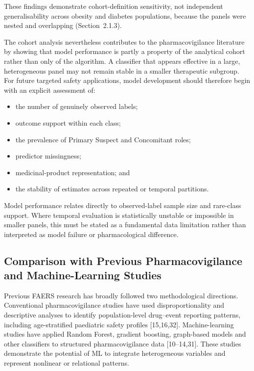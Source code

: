 \documentclass[10pt]{article}
\begin{document}
These findings demonstrate cohort-definition sensitivity, not independent generalisability across obesity and diabetes populations, because the panels were nested and overlapping (Section~2.1.3).

The cohort analysis nevertheless contributes to the pharmacovigilance literature by showing that model performance is partly a property of the analytical cohort rather than only of the algorithm. A classifier that appears effective in a large, heterogeneous panel may not remain stable in a smaller therapeutic subgroup. For future targeted safety applications, model development should therefore begin with an explicit assessment of:
\begin{itemize}
\item the number of genuinely observed labels;
\item outcome support within each class;
\item the prevalence of Primary Suspect and Concomitant roles;
\item predictor missingness;
\item medicinal-product representation; and
\item the stability of estimates across repeated or temporal partitions.
\end{itemize}

Model performance relates directly to observed-label sample size and rare-class support. Where temporal evaluation is statistically unstable or impossible in smaller panels, this must be stated as a fundamental data limitation rather than interpreted as model failure or pharmacological difference.

\subsection{Comparison with Previous Pharmacovigilance and Machine-Learning Studies}
Previous FAERS research has broadly followed two methodological directions. Conventional pharmacovigilance studies have used disproportionality and descriptive analyses to identify population-level drug--event reporting patterns, including age-stratified paediatric safety profiles [15,16,32]. Machine-learning studies have applied Random Forest, gradient boosting, graph-based models and other classifiers to structured pharmacovigilance data [10--14,31]. These studies demonstrate the potential of ML to integrate heterogeneous variables and represent nonlinear or relational patterns.
\end{document}
